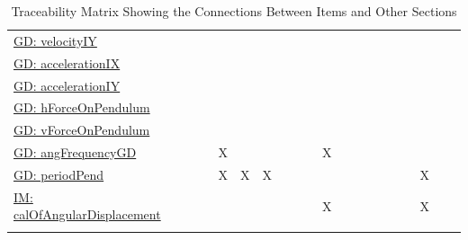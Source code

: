 \documentclass[12pt]{article}
\begin{document}
\begin{longtable}{l l l l l l l l l l l l l l l l l l l}
\\
\hyperref[GD:velocityIY]{GD: velocityIY} &  &  &  &  &  &  &  &  &  &  &  &  &  &  &  &  &  & 
\\
\hyperref[GD:accelerationIX]{GD: accelerationIX} &  &  &  &  &  &  &  &  &  &  &  &  &  &  &  &  &  & 
\\
\hyperref[GD:accelerationIY]{GD: accelerationIY} &  &  &  &  &  &  &  &  &  &  &  &  &  &  &  &  &  & 
\\
\hyperref[GD:hForceOnPendulum]{GD: hForceOnPendulum} &  &  &  &  &  &  &  &  &  &  &  &  &  &  &  &  &  & 
\\
\hyperref[GD:vForceOnPendulum]{GD: vForceOnPendulum} &  &  &  &  &  &  &  &  &  &  &  &  &  &  &  &  &  & 
\\
\hyperref[GD:angFrequencyGD]{GD: angFrequencyGD} &  &  & X &  &  &  &  &  & X &  &  &  &  &  &  &  &  & 
\\
\hyperref[GD:periodPend]{GD: periodPend} &  &  & X & X & X &  &  &  &  &  &  &  &  &  &  & X &  & 
\\
\hyperref[IM:calOfAngularDisplacement]{IM: calOfAngularDisplacement} &  &  &  &  &  &  &  &  & X &  &  &  &  &  &  & X &  & 
\\
\bottomrule
\caption{Traceability Matrix Showing the Connections Between Items and Other Sections}
\label{Table:TraceMatRefvsRef}
\end{longtable}
\end{document}
